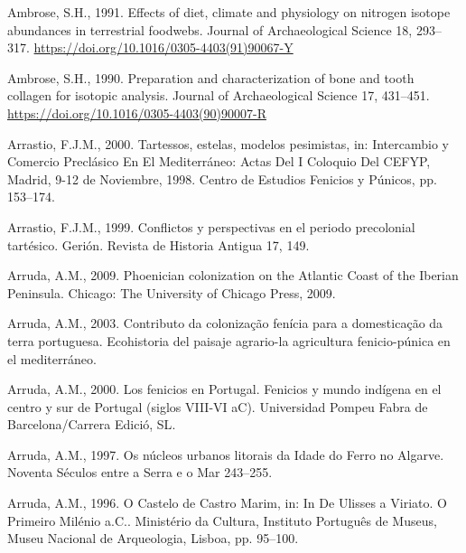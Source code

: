 \documentclass[preprint, 3p, authoryear]{elsarticle} %
\newlength{\cslhangindent}
\newlength{\cslentryspacingunit} %
\newenvironment{CSLReferences}[2] %
 {%
  \setlength{\parindent}{0pt}
  \ifodd #1
  \let\oldpar\par
  \def\par{\hangindent=\cslhangindent\oldpar}
  \fi
  \setlength{\parskip}{#2\cslentryspacingunit}
 }%
 {}
\begin{document}
\hypertarget{refs}{}
\begin{CSLReferences}{1}{0}
\leavevmode{}%
Ambrose, S.H., 1991. Effects of diet, climate and physiology on nitrogen isotope abundances in terrestrial foodwebs. Journal of Archaeological Science 18, 293--317. \url{https://doi.org/10.1016/0305-4403(91)90067-Y}

\leavevmode{}%
Ambrose, S.H., 1990. Preparation and characterization of bone and tooth collagen for isotopic analysis. Journal of Archaeological Science 17, 431--451. \url{https://doi.org/10.1016/0305-4403(90)90007-R}

\leavevmode{}%
Arrastio, F.J.M., 2000. Tartessos, estelas, modelos pesimistas, in: Intercambio y Comercio Preclásico En El {Mediterráneo}: Actas Del {I} Coloquio Del {CEFYP}, {Madrid}, 9-12 de Noviembre, 1998. {Centro de Estudios Fenicios y Púnicos}, pp. 153--174.

\leavevmode{}%
Arrastio, F.J.M., 1999. Conflictos y perspectivas en el periodo precolonial tartésico. Gerión. Revista de Historia Antigua 17, 149.

\leavevmode{}%
Arruda, A.M., 2009. Phoenician colonization on the {Atlantic Coast} of the {Iberian Peninsula}. {Chicago: The University of Chicago Press, 2009.}

\leavevmode{}%
Arruda, A.M., 2003. Contributo da colonização fenícia para a domesticação da terra portuguesa. Ecohistoria del paisaje agrario-la agricultura fenicio-púnica en el mediterráneo.

\leavevmode{}%
Arruda, A.M., 2000. Los fenicios en {Portugal}. {Fenicios} y mundo indígena en el centro y sur de {Portugal} (siglos {VIII}-{VI aC}). {Universidad Pompeu Fabra de Barcelona/Carrera Edició, SL}.

\leavevmode{}%
Arruda, A.M., 1997. Os núcleos urbanos litorais da {Idade} do {Ferro} no {Algarve}. Noventa Séculos entre a Serra e o Mar 243--255.

\leavevmode{}%
Arruda, A.M., 1996. O {Castelo} de {Castro Marim}, in: In {De Ulisses} a {Viriato}. {O} Primeiro Milénio a.{C}.. {Ministério da Cultura, Instituto Português de Museus, Museu Nacional de Arqueologia}, {Lisboa}, pp. 95--100.


\end{CSLReferences}
\end{document}
